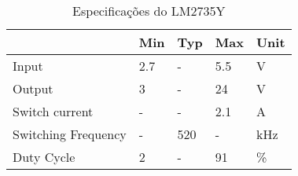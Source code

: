 \begin{table}
\centering
\caption{Especificações do LM2735Y}
\label{lm2735_specs_table}
\begin{tabular}{|l|l|l|l|l|} 
\cline{2-5}
\multicolumn{1}{c|}{} & \multicolumn{1}{c|}{Min} & \multicolumn{1}{c|}{Typ} & \multicolumn{1}{c|}{Max} & Unit  \\ 
\hline
Input                 & 2.7                      & -                        & 5.5                      & V     \\ 
\hline
Output                & 3                        & -                        & 24                       & V   \\ 
\hline
Switch current                & -                        & -                        & 2.1                      & A   \\ 
\hline
Switching Frequency   & -                        & 520                      & -                        & kHz   \\
\hline
Duty Cycle   & 2                        & -                      & 91                        & \%   \\
\hline
\end{tabular}
\end{table}